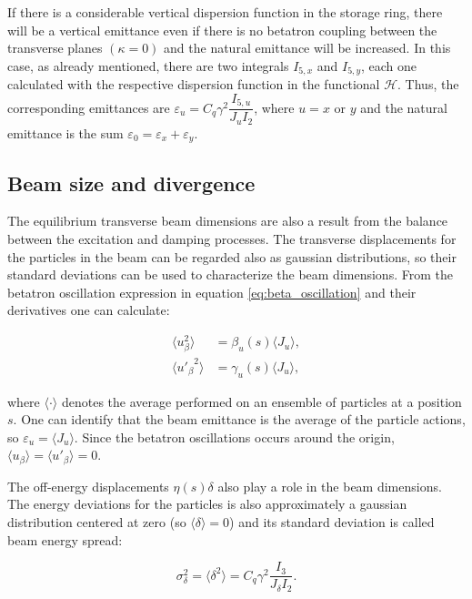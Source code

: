 If there is a considerable vertical dispersion function in the storage ring, there will be a vertical emittance even if there is no betatron coupling between the transverse planes $(\kappa = 0)$ and the natural emittance will be increased. In this case, as already mentioned, there are two integrals $I_{5, x}$ and $I_{5, y}$, each one calculated with the respective dispersion function in the functional $\mathcal{H}$. Thus, the corresponding emittances are $\varepsilon_u = C_q \gamma^2 \dfrac{I_{5, u}}{J_u I_2}$, where $u=x$ or $y$ and the natural emittance is the sum $\varepsilon_0 = \varepsilon_x + \varepsilon_y$.

\subsection{Beam size and divergence}

The equilibrium transverse beam dimensions are also a result from the balance between the excitation and damping processes. The transverse displacements for the particles in the beam can be regarded also as gaussian distributions, so their standard deviations can be used to characterize the beam dimensions. From the betatron oscillation expression in equation \eqref{eq:beta_oscillation} and their derivatives one can calculate:

\begin{align}
    \langle u_{\beta}^2 \rangle &= \beta_u(s) \langle J_u \rangle,  \\
    \langle {u'_{\beta}}^{2} \rangle &= \gamma_u(s) \langle J_u \rangle,
\end{align}

where $\langle \cdot \rangle$ denotes the average performed on an ensemble of particles at a position $s$. One can identify that the beam emittance is the average of the particle actions, so $\varepsilon_u = \langle J_u \rangle$. Since the betatron oscillations occurs around the origin, $\langle u_{\beta}\rangle = \langle u'_{\beta}\rangle = 0$. 

The off-energy displacements $\eta(s)\delta$ also play a role in the beam dimensions. The energy deviations for the particles is also approximately a gaussian distribution centered at zero (so $\langle \delta \rangle = 0$) and its standard deviation is called beam energy spread:

\begin{equation}
    \sigma^2_{\delta} = \langle \delta ^2\rangle = C_q \gamma^2\dfrac{I_3}{J_{\delta}I_2}.
\end{equation}

